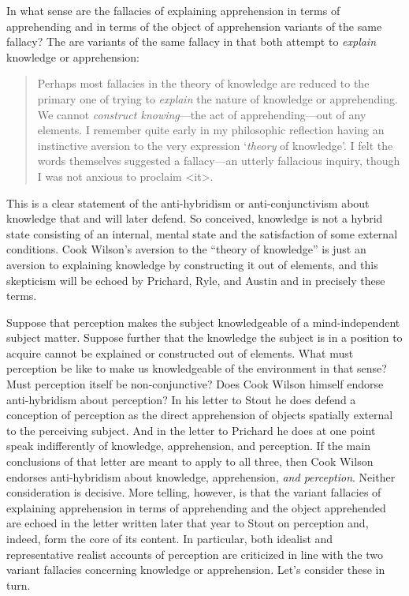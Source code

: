 \documentclass[11pt]{article}
\begin{document}
In what sense are the fallacies of explaining apprehension in terms of apprehending and in terms of the object of apprehension variants of the same fallacy? The are variants of the same fallacy in that both attempt to \emph{explain} knowledge or apprehension:
\begin{quote}
	Perhaps most fallacies in the theory of knowledge are reduced to the primary one of trying to \emph{explain} the nature of knowledge or apprehending. We cannot \emph{construct knowing}---the act of apprehending---out of any elements. I remember quite early in my philosophic reflection having an instinctive aversion to the very expression `\emph{theory} of knowledge'. I felt the words themselves suggested a fallacy---an utterly fallacious inquiry, though I was not anxious to proclaim <it>. \citep[803]{Cook-Wilson:1926sf}
\end{quote}
This is a clear statement of the anti-hybridism or anti-conjunctivism about knowledge that \citet{McDowell:1982kx} and \citet{Williamson:2000lr} will later defend. So conceived, knowledge is not a hybrid state consisting of an internal, mental state and the satisfaction of some external conditions. Cook Wilson's aversion to the ``theory of knowledge'' is just an aversion to explaining knowledge by constructing it out of elements, and this skepticism will be echoed by Prichard, Ryle, and Austin and in precisely these terms.

Suppose that perception makes the subject knowledgeable of a mind-independent subject matter. Suppose further that the knowledge the subject is in a position to acquire cannot be explained or constructed out of elements. What must perception be like to make us knowledgeable of the environment in that sense? Must perception itself be non-conjunctive? Does Cook Wilson himself endorse anti-hybridism about perception? In his letter to Stout he does defend a conception of perception as the direct apprehension of objects spatially external to the perceiving subject. And in the letter to Prichard he does at one point speak indifferently of knowledge, apprehension, and perception. If the main conclusions of that letter are meant to apply to all three, then Cook Wilson endorses anti-hybridism about knowledge, apprehension, \emph{and perception}. Neither consideration is decisive. More telling, however, is that the variant fallacies of explaining apprehension in terms of apprehending and the object apprehended are echoed in the letter written later that year to Stout on perception and, indeed, form the core of its content. In particular, both idealist and representative realist accounts of perception are criticized in line with the two variant fallacies concerning knowledge or apprehension. Let's consider these in turn.
\end{document}
